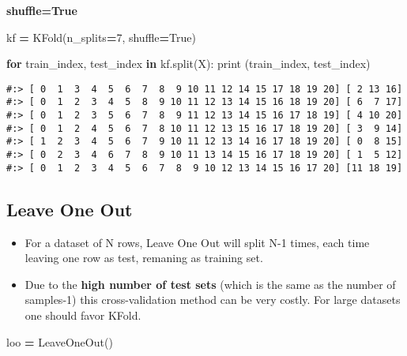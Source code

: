 \documentclass[
]{book}
\newenvironment{Shaded}{\begin{snugshade}}{\end{snugshade}}
\newcommand{\BuiltInTok}[1]{#1}
\newcommand{\ControlFlowTok}[1]{\textcolor[rgb]{0.27,0.27,0.27}{\textbf{#1}}}
\newcommand{\DecValTok}[1]{\textcolor[rgb]{0.06,0.06,0.06}{#1}}
\newcommand{\KeywordTok}[1]{\textcolor[rgb]{0.27,0.27,0.27}{\textbf{#1}}}
\newcommand{\NormalTok}[1]{#1}
\newcommand{\OperatorTok}[1]{\textcolor[rgb]{0.43,0.43,0.43}{\textbf{#1}}}
\newcommand{\VariableTok}[1]{\textcolor[rgb]{0,0,0}{#1}}
\providecommand{\tightlist}{%
  \setlength{\itemsep}{0pt}\setlength{\parskip}{0pt}}
\begin{document}
\textbf{shuffle=True}

\begin{Shaded}
\begin{Highlighting}[]
\NormalTok{kf }\OperatorTok{=}\NormalTok{ KFold(n\_splits}\OperatorTok{=}\DecValTok{7}\NormalTok{, shuffle}\OperatorTok{=}\VariableTok{True}\NormalTok{)}
\end{Highlighting}
\end{Shaded}

\begin{Shaded}
\begin{Highlighting}[]
\ControlFlowTok{for}\NormalTok{ train\_index, test\_index }\KeywordTok{in}\NormalTok{ kf.split(X):}
  \BuiltInTok{print}\NormalTok{ (train\_index, test\_index)}
\end{Highlighting}
\end{Shaded}

\begin{verbatim}
#:> [ 0  1  3  4  5  6  7  8  9 10 11 12 14 15 17 18 19 20] [ 2 13 16]
#:> [ 0  1  2  3  4  5  8  9 10 11 12 13 14 15 16 18 19 20] [ 6  7 17]
#:> [ 0  1  2  3  5  6  7  8  9 11 12 13 14 15 16 17 18 19] [ 4 10 20]
#:> [ 0  1  2  4  5  6  7  8 10 11 12 13 15 16 17 18 19 20] [ 3  9 14]
#:> [ 1  2  3  4  5  6  7  9 10 11 12 13 14 16 17 18 19 20] [ 0  8 15]
#:> [ 0  2  3  4  6  7  8  9 10 11 13 14 15 16 17 18 19 20] [ 1  5 12]
#:> [ 0  1  2  3  4  5  6  7  8  9 10 12 13 14 15 16 17 20] [11 18 19]
\end{verbatim}

\hypertarget{leave-one-out}{%
\subsection{Leave One Out}\label{leave-one-out}}

\begin{itemize}
\tightlist
\item
  For a dataset of N rows, Leave One Out will split N-1 times, each time leaving one row as test, remaning as training set.\\
\item
  Due to the \textbf{high number of test sets} (which is the same as the number of samples-1) this cross-validation method can be very costly. For large datasets one should favor KFold.
\end{itemize}

\begin{Shaded}
\begin{Highlighting}[]
\NormalTok{loo }\OperatorTok{=}\NormalTok{ LeaveOneOut()}
\end{Highlighting}
\end{Shaded}
\end{document}

